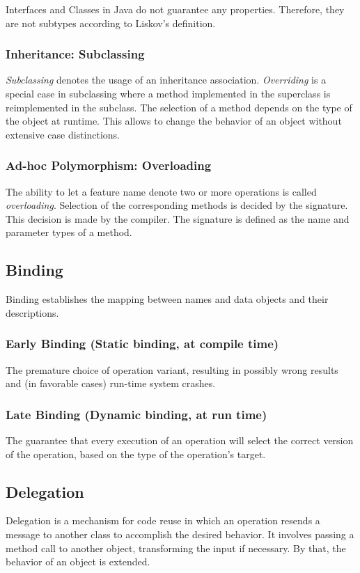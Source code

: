 Interfaces and Classes in Java do not guarantee any properties. Therefore, they are not subtypes according to Liskov’s definition.

\subsubsection*{Inheritance: Subclassing}
\textit{Subclassing} denotes the usage of an inheritance association.
\textit{Overriding} is a special case in subclassing where a method implemented in the superclass is reimplemented in the subclass.
The selection of a method depends on the type of the object at runtime.
This allows to change the behavior of an object without extensive case distinctions.

\subsubsection*{Ad-hoc Polymorphism: Overloading}
The ability to let a feature name denote two or more operations is called \textit{overloading}.
Selection of the corresponding methods is decided by the signature.
This decision is made by the compiler.
The signature is defined as the name and parameter types of a method.


\subsection{Binding}
Binding establishes the mapping between names and data objects and their descriptions.

\subsubsection*{Early Binding (Static binding, at compile time)}
The premature choice of operation variant, resulting in possibly wrong results and (in favorable cases) run-time system crashes.

\subsubsection*{Late Binding (Dynamic binding, at run time)}
The guarantee that every execution of an operation will select the correct version of the operation, based on the type of the operation's target.

\subsection{Delegation}
Delegation is a mechanism for code reuse in which an operation resends a message to another class to accomplish the desired behavior.
It involves passing a method call to another object, transforming the input if necessary.
By that, the behavior of an object is extended.

\newpage